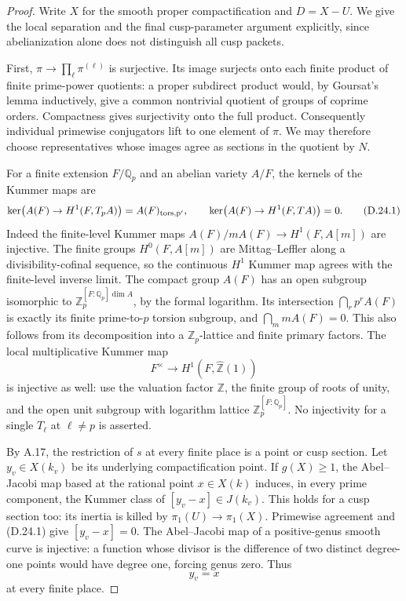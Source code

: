 \begin{proof}
Write \(X\) for the smooth proper
compactification and \(D=X-U\). We give the
local separation and the final cusp-parameter
argument explicitly, since abelianization
alone does not distinguish all cusp packets.

First, \(\pi\to\prod_\ell\pi^{(\ell)}\) is
surjective. Its image surjects onto each
finite product of finite prime-power
quotients: a proper subdirect product would,
by Goursat's lemma inductively, give a common
nontrivial quotient of groups of coprime
orders. Compactness gives surjectivity onto
the full product. Consequently individual
primewise conjugators lift to one element
of \(\pi\). We may therefore choose
representatives whose images agree as
sections in the quotient by \(N\).

For a finite extension \(F/\mathbb Q_p\) and
an abelian variety \(A/F\), the kernels of
the Kummer maps are
\[
 \ker\bigl(A(F)\to H^1(F,T_pA)\bigr)
       =A(F)_{\rm tors,p'},\qquad
 \ker\bigl(A(F)\to H^1(F,TA)\bigr)=0.             \tag{D.24.1}
\]
Indeed the finite-level Kummer maps
\(A(F)/mA(F)\to H^1(F,A[m])\) are injective.
The finite groups \(H^0(F,A[m])\)
are Mittag--Leffler along a divisibility-cofinal
sequence, so the continuous \(H^1\) Kummer map
agrees with the finite-level inverse limit.
The compact group \(A(F)\) has an open
subgroup isomorphic to \(\mathbb Z_p^{[F:\mathbb Q_p]\dim A}\),
by the formal logarithm. Its intersection
\(\bigcap_r p^rA(F)\) is exactly its finite
prime-to-\(p\) torsion subgroup, and
\(\bigcap_m mA(F)=0\). This also follows
from its decomposition into a
\(\mathbb Z_p\)-lattice and finite primary
factors. The local multiplicative Kummer map
\[
       F^\times\longrightarrow
       H^1(F,\widehat{\mathbb Z}(1))              \tag{D.24.2}
\]
is injective as well: use the valuation
factor \(\mathbb Z\), the finite group of
roots of unity, and the open unit subgroup
with logarithm lattice \(\mathbb Z_p^{[F:\mathbb Q_p]}\).
No injectivity for a single \(T_\ell\) at
\(\ell\ne p\) is asserted.

By A.17, the restriction of \(s\) at every
finite place is a point or cusp section.
Let \(y_v\in X(k_v)\) be its underlying
compactification point. If \(g(X)\ge1\),
the Abel--Jacobi map based at the rational
point \(x\in X(k)\) induces, in every
prime component, the Kummer class of
\([y_v-x]\in J(k_v)\). This holds for a
cusp section too: its inertia is killed
by \(\pi_1(U)\to\pi_1(X)\). Primewise
agreement and (D.24.1) give \([y_v-x]=0\).
The Abel--Jacobi map of a positive-genus
smooth curve is injective: a function
whose divisor is the difference of two
distinct degree-one points would have
degree one, forcing genus zero. Thus
\[
                         y_v=x                  \tag{D.24.3}
\]
at every finite place.


\end{proof}
